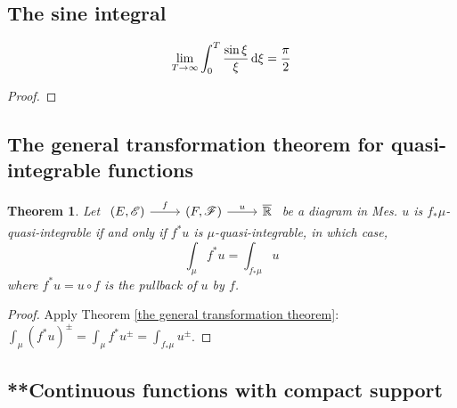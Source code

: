 \documentclass[11pt, a4paper, openany]{book}
\newtheorem{thm}{Theorem}\newtheorem{lem}{Lemma}\newtheorem{crl}{Corollary}
\theoremstyle{definition}
\newcommand{\cat}[1]{\textup{\textsf{#1}}}
\newcommand{\er}{\overline{\mathbb{R}}}
\begin{document}
\subsection{The sine integral}
    \[\lim_{T\to\infty}\int_0^T \frac{\sin\xi}{\xi}\odif \xi=\frac{\pi}{2}\]
    \begin{proof}
        
    \end{proof}
\subsection{The general transformation theorem for quasi-integrable functions}
    \begin{thm}\label{the general transformation theorem for quasi-integrable functions}
        Let $\begin{tikzcd}
            (E,\mathscr{E}) \ar[r, "f"] & (F,\mathscr{F}) \ar[r, "u"] & \er
        \end{tikzcd}$ be a diagram in \cat{Mes}. $u$ is $f_*\mu$-quasi-integrable if and only if $f^*u$ is $\mu$-quasi-integrable, in which case,
        \[\int_\mu f^* u=\int_{f_*\mu} u\]
        where $f^* u=u\circ f$ is the pullback of $u$ by $f$.
    \end{thm}
    \begin{proof}
        Apply Theorem \ref{the general transformation theorem}: $\int_\mu(f^*u)^\pm=\int_\mu f^*u^\pm=\int_{f_*\mu}u^\pm$.
    \end{proof}
\subsection{**Continuous functions with compact support}
\end{document}

